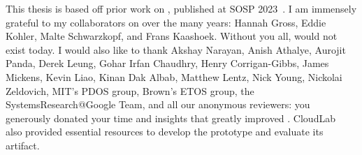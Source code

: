 
%
This thesis is based off prior work on \sys, published at SOSP 2023~\cite{edna}.
I am immensely grateful to my collaborators on \sys over the many years: Hannah
Gross, Eddie Kohler, Malte Schwarzkopf, and Frans Kaashoek. Without you all,
\sys would not exist today.
%
I would also like to thank Akshay Narayan, Anish Athalye, Aurojit Panda, Derek
Leung, Gohar Irfan Chaudhry, Henry Corrigan-Gibbs, James Mickens, Kevin Liao,
Kinan Dak Albab, Matthew Lentz, Nick Young, Nickolai Zeldovich, MIT's PDOS
group, Brown's ETOS group, the SystemsResearch@Google Team, and all our
anonymous reviewers: you generously donated your time and insights that greatly
improved \sys. 
%
CloudLab~\cite{cloudlab} also provided essential resources to develop the \sys prototype
and evaluate its artifact.
%
%
%
%



\begin{comment}
**Family**
Stephanie ("Stephie")
Parents (Phaih-lan Law, Kenwood Tsai)
Ah-ma and Ah-gong Tsai
Cecilia and Jacek Smolinski
Jackie and Kenny Smolinski
Ah-Ee (and my god-dogs, Toby and Sparky)
Wei-Jen and Wei-Ken
Ah-ma and Ah-gong Lau

**Family++**
Benji Kilimnik
Trevor Hohn
Aunty Sally
Aunty Alice
Tuaku and Tuakim


**Researchers**
Akshay Narayan, Anish Athalye, Derek Leung, Gohar Irfan Chaudhry, Henry
Corrigan-Gibbs, James Mickens, Kevin Liao, Kinan Dak Albab, Matthew Lentz,
Nickolai Zeldovich, and the anonymous reviewers 

Stefan Saroiu
Eddie Kohler
Margo Seltzer
James Mickens
Phil Levis
Kim Keeton
Anastasia

Hannah Gross
Nick Young 

MIT's PDOS group, Brown's ETOS group, and
the SystemsResearch@Google Team 

Joel Emer

Helena
Yannis
Hamish
Frank
Vibhaa
Sukhi Gulati
Julia Netter
Mathilda van Es

Too many to name over the years who've influenced my way of thinking.
Alexander Kojevnikov, Brian Zimmer

**Health Team**

**Music**
Lynn Chang and Lisa Wong
Solon Gordon
Jenn Chang
Ken Allen
Cindy Fong
Mary Jane
Justin Solomon
Music for Food (April)
Elias Miller and Apollo Ensemble
Jeremy Lang

**Climbing/Cambridge**
Whitney
Oliver
Lekha
Anders
Rick
Chris/Bess
John Langan
Aman

**Friends for Life**
Daniel
Henry
James
Ashvin
Melissa
Zach
Wentong
Roberta
Hanson
Yihe
Anitha
Samyu
Karima
Ruth and Brian
Serena Booth
Serena Wang
Lara Booth
Ethan Tsai
Jeffrey Kwong
Susan Nitta
Robert Bastian
Swole Crew""
Kevin Liao
Nikhil
Jenny

\end{comment}
